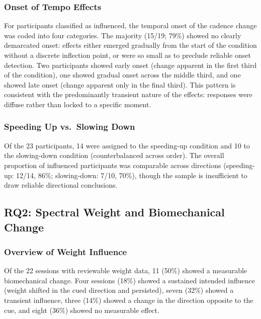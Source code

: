\subsubsection{Onset of Tempo Effects}

For participants classified as influenced, the temporal onset of the cadence
change was coded into four categories. The majority (15/19; 79\%) showed no
clearly demarcated onset: effects either emerged gradually from the start of
the condition without a discrete inflection point, or were so small as to
preclude reliable onset detection. Two participants showed early onset (change
apparent in the first third of the condition), one showed gradual onset across
the middle third, and one showed late onset (change apparent only in the final
third). This pattern is consistent with the predominantly transient nature of
the effects: responses were diffuse rather than locked to a specific moment.

\subsubsection{Speeding Up vs.\ Slowing Down}

Of the 23 participants, 14 were assigned to the speeding-up condition and 10 to
the slowing-down condition (counterbalanced across order). The overall
proportion of influenced participants was comparable across directions
(speeding-up: 12/14, 86\%; slowing-down: 7/10, 70\%), though the sample is
insufficient to draw reliable directional conclusions.

\subsection{RQ2: Spectral Weight and Biomechanical Change}
\label{sec:results:weight}

\subsubsection{Overview of Weight Influence}

Of the 22 sessions with reviewable weight data, 11 (50\%) showed a measurable
biomechanical change. Four sessions (18\%) showed a sustained intended
influence (weight shifted in the cued direction and persisted), seven (32\%)
showed a transient influence, three (14\%) showed a change in the direction
opposite to the cue, and eight (36\%) showed no measurable effect.

